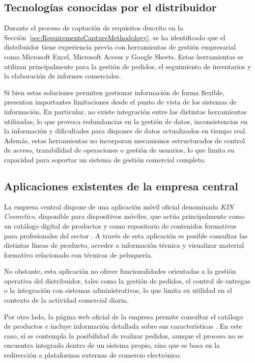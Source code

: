 \subsection{Tecnologías conocidas por el distribuidor}

Durante el proceso de captación de requisitos descrito en la Sección~\ref{sec:RequirementsCaptureMethodology}, se ha identificado que el distribuidor tiene experiencia previa con herramientas de gestión empresarial como Microsoft Excel, Microsoft Access y Google Sheets. Estas herramientas se utilizan principalmente para la gestión de pedidos, el seguimiento de inventarios y la elaboración de informes comerciales.

Si bien estas soluciones permiten gestionar información de forma flexible, presentan importantes limitaciones desde el punto de vista de los sistemas de información. En particular, no existe integración entre las distintas herramientas utilizadas, lo que provoca redundancias en la gestión de datos, inconsistencias en la información y dificultades para disponer de datos actualizados en tiempo real. Además, estas herramientas no incorporan mecanismos estructurados de control de acceso, trazabilidad de operaciones o gestión de usuarios, lo que limita su capacidad para soportar un sistema de gestión comercial completo.

\subsection{Aplicaciones existentes de la empresa central}

La empresa central dispone de una aplicación móvil oficial denominada \textit{KIN Cosmetics}, disponible para dispositivos móviles, que actúa principalmente como un catálogo digital de productos y como repositorio de contenidos formativos para profesionales del sector \cite{kintrends}. A través de esta aplicación es posible consultar las distintas líneas de producto, acceder a información técnica y visualizar material formativo relacionado con técnicas de peluquería.

No obstante, esta aplicación no ofrece funcionalidades orientadas a la gestión operativa del distribuidor, tales como la gestión de pedidos, el control de entregas o la integración con sistemas administrativos, lo que limita su utilidad en el contexto de la actividad comercial diaria.

Por otro lado, la página web oficial de la empresa permite consultar el catálogo de productos e incluye información detallada sobre sus características \cite{kincosmetics_web}. En este caso, sí se contempla la posibilidad de realizar pedidos, aunque el proceso no se encuentra integrado dentro de un sistema propio, sino que se basa en la redirección a plataformas externas de comercio electrónico.

